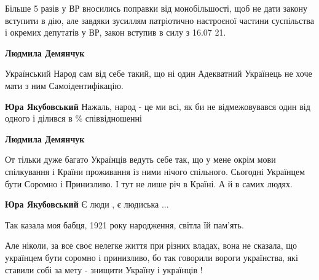 \begin{itemize}
\begin{itemize}
Більше 5 разів у ВР вносились поправки від монобільшості, щоб не дати закону
вступити в дію, але завдяки зусиллям патріотично настроєної частини суспільства
і окремих депутатів у ВР, закон вступив в силу з 16.07 21.


 
\textbf{Людмила Демянчук} 

Український Народ сам від себе такий, що ні один Адекватний Українець не хоче
мати з ним Самоідентифікацію.


 
\textbf{Юра Якубовський}
Нажаль, народ - це ми всі, як би не відмежовувався один від одного і ділився в
\% співвідношенні


 
\textbf{Людмила Демянчук} 

От тільки дуже багато Українців ведуть себе так, що у мене окрім мови
спілкування і Країни проживання із ними нічого спільного. Сьогодні Українцем
бути Соромно і Принизливо. І тут не лише річ в Країні. А й в самих людях.

 
\textbf{Юра Якубовський}
Є люди , є людиська ...

Так казала моя бабця, 1921 року народження, світла їй пам'ять.

Але ніколи, за все своє нелегке життя при різних владах, вона не сказала, що
українцем бути соромно і принизливо, бо так говорили вороги українства, які
ставили собі за мету - знищити Україну і українців !


\end{itemize}
\end{itemize}
